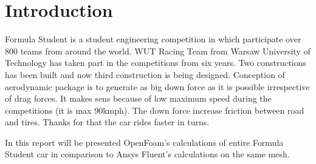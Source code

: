 \section{Introduction}

Formula Student is a student engineering competition in which participate over 800 teams from around the world. WUT Racing Team from Warsaw University of Technology has taken part in the competitions from six years. Two constructions has been built and now third construction is being designed. Conception of aerodynamic package is to generate as big down force as it is possible irrespective of drag forces. It makes sens because of low maximum speed during the competitions (it is max 90kmph). The down force increase friction between road and tires. Thanks for that the car rides faster in turns.

In this report will be presented OpenFoam's calculations of entire Formula Student car in comparison to Ansys Fluent's calculations on the same mesh. 